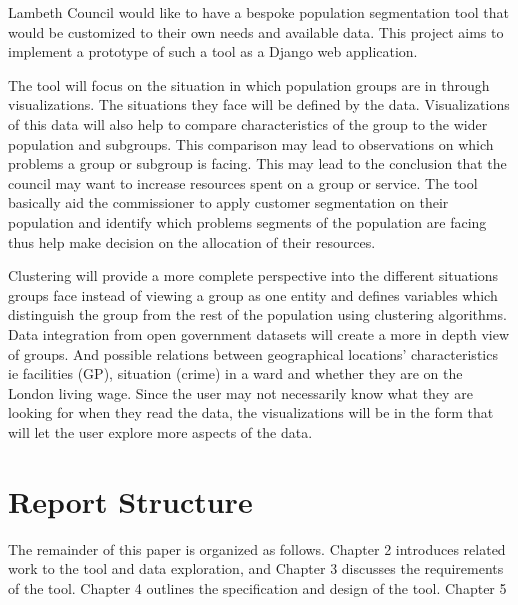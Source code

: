 \documentclass[11pt]{informatics-report}
\begin{document}
Lambeth Council would like to have a bespoke population segmentation tool that would be customized to their own needs and available data. This project aims to implement a prototype of such a tool as a Django web application.\par

The tool will focus on the situation in which population groups are in through visualizations. The situations they face will be defined by the data. Visualizations of this data will also help to compare characteristics of the group to the wider population and subgroups. This comparison may lead to observations on which problems a group or subgroup is facing. This may lead to the conclusion that the council may want to increase resources spent on a group or service. The tool basically aid the commissioner to apply customer segmentation on their population and identify which problems segments of the population are facing thus help make decision on the allocation of their resources.\par

Clustering will provide a more complete perspective into the different situations groups face instead of viewing a group as one entity and defines variables which distinguish the group from the rest of the population using clustering algorithms. Data integration from open government datasets will create a more in depth view of groups. And possible relations between geographical locations’ characteristics ie facilities (GP), situation (crime) in a ward and whether they are on the London living wage. Since the user may not necessarily know what they are looking for when they read the data, the visualizations will be in the form that will let the user explore more aspects of the data.\par

\section{Report Structure}
The remainder of this paper is organized as follows. Chapter 2 introduces related work to the tool and data exploration, and Chapter 3 discusses the requirements of the tool. Chapter 4 outlines the specification and design of the tool. Chapter 5













\appendix



\end{document}
